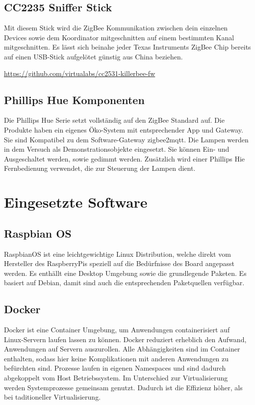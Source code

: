 \subsection{CC2235 Sniffer Stick}

Mit diesem Stick wird die ZigBee Kommunikation zwischen dein einzelnen Devices sowie dem Koordinator mitgeschnitten auf einem bestimmten Kanal mitgeschnitten.
Es lässt sich beinahe jeder Texas Instruments ZigBee Chip bereits auf einen USB-Stick aufgelötet günstig aus China beziehen. 

\url{https://github.com/virtualabs/cc2531-killerbee-fw}

\subsection{Phillips Hue Komponenten}

Die Phillips Hue Serie setzt vollständig auf den ZigBee Standard auf. Die Produkte haben ein eigenes Öko-System mit entsprechender App und Gateway. Sie sind Kompatibel
zu dem Software-Gateway zigbee2mqtt.
Die Lampen werden in dem Versuch als Demonstrationsobjekte eingesetzt. Sie können Ein- und Ausgeschaltet werden, sowie gedimmt werden. Zusätzlich wird einer
Phillips Hie Fernbedienung verwendet, die zur Steuerung der Lampen dient.

\section{Eingesetzte Software}

\subsection{Raspbian OS}

RaspbianOS ist eine leichtgewichtige Linux Distribution, welche direkt vom Hersteller des RaspberryPis speziell auf die Bedürfnisse des Board angepasst werden. Es enthällt eine
Desktop Umgebung sowie die grundlegende Paketen. Es basiert auf Debian, damit sind auch die entsprechenden Paketquellen verfügbar.

\subsection{Docker}

Docker ist eine Container Umgebung, um Anwendungen containerisiert auf Linux-Servern laufen lassen zu können. Docker reduziert erheblich den Aufwand, 
Anwendungen auf Servern auszurollen. Alle Abhängigkeiten sind im Container enthalten, sodass hier keine Komplikationen mit anderen Anwendungen
zu befürchten sind. Prozesse laufen in eigenen Namespaces und sind dadurch abgekoppelt vom Host Betriebssystem. Im Unterschied zur Virtualisierung werden
Systemprozesse gemeinsam genutzt. Dadurch ist die Effizienz höher, als bei taditioneller Virtualisierung.

